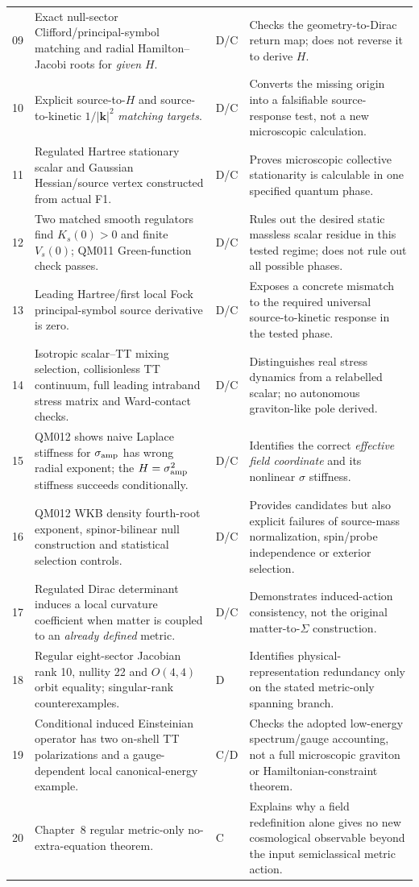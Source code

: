 \documentclass[11pt,a4paper]{article}
\begin{document}
\begin{longtable}{@{}p{.075\linewidth}p{.36\linewidth}p{.075\linewidth}p{.38\linewidth}@{}}
09&Exact null-sector Clifford/principal-symbol matching and radial Hamilton--Jacobi roots for \emph{given} $H$.&D/C&Checks the geometry-to-Dirac return map; does not reverse it to derive $H$.\\
10&Explicit source-to-$H$ and source-to-kinetic $1/|\bm k|^2$ \emph{matching targets}.&D/C&Converts the missing origin into a falsifiable source-response test, not a new microscopic calculation.\\
11&Regulated Hartree stationary scalar and Gaussian Hessian/source vertex constructed from actual F1.&D/C&Proves microscopic collective stationarity is calculable in one specified quantum phase.\\
12&Two matched smooth regulators find $K_s(0)>0$ and finite $V_s(0)$; QM011 Green-function check passes.&D/C&Rules out the desired static massless scalar residue in this tested regime; does not rule out all possible phases.\\
13&Leading Hartree/first local Fock principal-symbol source derivative is zero.&D/C&Exposes a concrete mismatch to the required universal source-to-kinetic response in the tested phase.\\
14&Isotropic scalar--TT mixing selection, collisionless TT continuum, full leading intraband stress matrix and Ward-contact checks.&D/C&Distinguishes real stress dynamics from a relabelled scalar; no autonomous graviton-like pole derived.\\
15&QM012 shows naive Laplace stiffness for $\sigma_{\rm amp}$ has wrong radial exponent; the $H=\sigma_{\rm amp}^2$ stiffness succeeds conditionally.&D/C&Identifies the correct \emph{effective field coordinate} and its nonlinear $\sigma$ stiffness.\\
16&QM012 WKB density fourth-root exponent, spinor-bilinear null construction and statistical selection controls.&D/C&Provides candidates but also explicit failures of source-mass normalization, spin/probe independence or exterior selection.\\
17&Regulated Dirac determinant induces a local curvature coefficient when matter is coupled to an \emph{already defined} metric.&D/C&Demonstrates induced-action consistency, not the original matter-to-$\Sigma$ construction.\\
18&Regular eight-sector Jacobian rank 10, nullity 22 and $O(4,4)$ orbit equality; singular-rank counterexamples.&D&Identifies physical-representation redundancy only on the stated metric-only spanning branch.\\
19&Conditional induced Einsteinian operator has two on-shell TT polarizations and a gauge-dependent local canonical-energy example.&C/D&Checks the adopted low-energy spectrum/gauge accounting, not a full microscopic graviton or Hamiltonian-constraint theorem.\\
20&Chapter~8 regular metric-only no-extra-equation theorem.&C&Explains why a field redefinition alone gives no new cosmological observable beyond the input semiclassical metric action.\\\bottomrule
\end{longtable}
\end{document}
